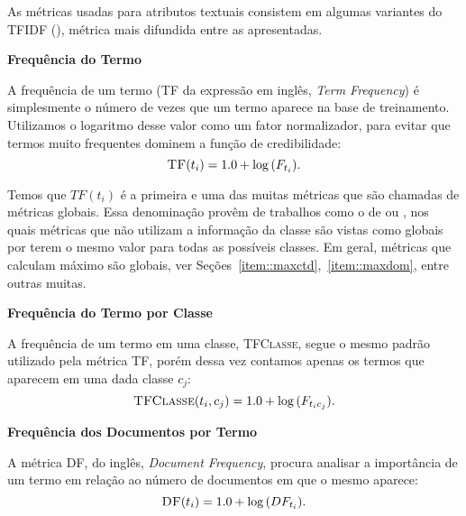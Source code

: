 As métricas usadas para atributos textuais consistem em algumas variantes do \textsc{TFIDF} (\cite{Salton88}), métrica mais difundida entre as apresentadas.

\begin{description}

\item{\textbf{Frequência do Termo}} %
\label{item::sumtf}

A frequência de um termo (\textsc{TF} da expressão em inglês, \textit{Term Frequency}) é simplesmente o número de vezes que um termo aparece na base de treinamento. Utilizamos o logaritmo desse valor como um fator normalizador, para evitar que termos muito frequentes dominem a função de credibilidade:
\begin{equation}\label{eqn::sumtf}
   \textsc{TF}(t_i) = 1.0 + \log{ ( F_{t_i} ) }.
\end{equation}

Temos que $TF(t_i)$ é a primeira e uma das muitas métricas que são chamadas de métricas globais. Essa denominação provêm de trabalhos como o de \cite{Lan05} ou \cite{Liu09}, nos quais métricas que não utilizam a informação da classe são vistas como globais por terem o mesmo valor para todas as possíveis classes. Em geral, métricas que calculam máximo são globais, ver Seções~\ref{item::maxctd},~\ref{item::maxdom}, entre outras muitas.

\item{\textbf{Frequência do Termo por Classe}} %
\label{item::tf}

A frequência de um termo em uma classe, \textsc{TFClasse}, segue o mesmo padrão utilizado pela métrica \textsc{TF}, porém dessa vez contamos apenas os termos que aparecem em uma dada classe $c_j$:
\begin{equation}\label{eqn::tf}
  \textsc{TFClasse}(t_i, c_j) = 1.0 + \log{ ( F_{t_ic_j} ) }.
\end{equation}


\item{\textbf{Frequência dos Documentos por Termo}}%
\label{item::df}

A métrica \textsc{DF}, do inglês, \textit{Document Frequency}, procura analisar a importância de um termo em relação ao número de documentos em que o mesmo aparece:
\begin{equation}\label{eqn::df}
  \textsc{DF}(t_i) = 1.0 + \log{ ( DF_{t_i} ) }.
\end{equation}



\end{description}
